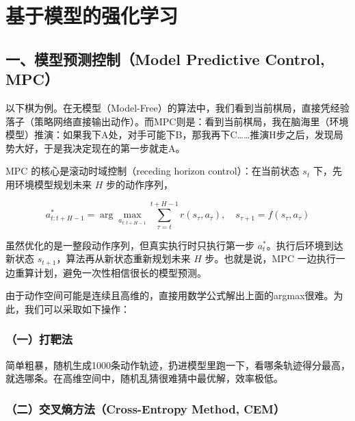 \setcounter{section}{1}

\hypertarget{ux57faux4e8eux6a21ux578bux7684ux5f3aux5316ux5b66ux4e60}{%
\section{基于模型的强化学习}\label{ux57faux4e8eux6a21ux578bux7684ux5f3aux5316ux5b66ux4e60}}

\hypertarget{ux4e00ux6a21ux578bux9884ux6d4bux63a7ux5236model-predictive-control-mpc}{%
\subsection{一、模型预测控制（Model Predictive Control, MPC）}\label{ux4e00ux6a21ux578bux9884ux6d4bux63a7ux5236model-predictive-control-mpc}}

以下棋为例。在无模型（Model-Free）的算法中，我们看到当前棋局，直接凭经验落子（策略网络直接输出动作）。而MPC则是：看到当前棋局，我在脑海里（环境模型）推演：如果我下A处，对手可能下B，那我再下C\ldots\ldots 推演H步之后，发现局势大好，于是我决定现在的第一步就走A。

MPC 的核心是滚动时域控制（receding horizon control）：在当前状态 \(s_t\) 下，先用环境模型规划未来 \(H\) 步的动作序列，

\[
a^*_{t:t+H-1}=\arg\max_{a_{t:t+H-1}}\sum_{\tau=t}^{t+H-1}r(s_\tau,a_\tau),
\quad s_{\tau+1}=f(s_\tau,a_\tau)
\]

虽然优化的是一整段动作序列，但真实执行时只执行第一步 \(a_t^*\)。执行后环境到达新状态 \(s_{t+1}\)，算法再从新状态重新规划未来 \(H\) 步。也就是说，MPC 一边执行一边重算计划，避免一次性相信很长的模型预测。

由于动作空间可能是连续且高维的，直接用数学公式解出上面的argmax很难。为此，我们可以采取如下操作：

\hypertarget{ux4e00ux6253ux9776ux6cd5}{%
\subsubsection{（一）打靶法}\label{ux4e00ux6253ux9776ux6cd5}}

简单粗暴，随机生成1000条动作轨迹，扔进模型里跑一下，看哪条轨迹得分最高，就选哪条。在高维空间中，随机乱猜很难猜中最优解，效率极低。

\hypertarget{ux4e8cux4ea4ux53c9ux71b5ux65b9ux6cd5cross-entropy-method-cem}{%
\subsubsection{（二）交叉熵方法（Cross-Entropy Method, CEM）}\label{ux4e8cux4ea4ux53c9ux71b5ux65b9ux6cd5cross-entropy-method-cem}}

